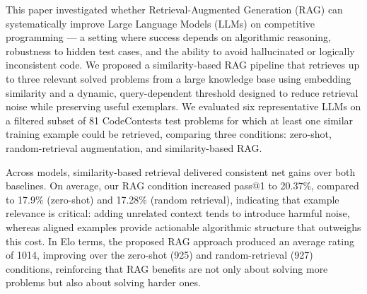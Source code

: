 \documentclass[preprint,12pt]{elsarticle}
\begin{document}



This paper investigated whether Retrieval-Augmented Generation (RAG) can systematically improve Large Language Models (LLMs) on competitive programming — a setting where success depends on algorithmic reasoning, robustness to hidden test cases, and the ability to avoid hallucinated or logically inconsistent code. We proposed a similarity-based RAG pipeline that retrieves up to three relevant solved problems from a large knowledge base using embedding similarity and a dynamic, query-dependent threshold designed to reduce retrieval noise while preserving useful exemplars. We evaluated six representative LLMs on a filtered subset of 81 CodeContests test problems for which at least one similar training example could be retrieved, comparing three conditions: zero-shot, random-retrieval augmentation, and similarity-based RAG. 

Across models, similarity-based retrieval delivered consistent net gains over both baselines. On average, our RAG condition increased pass@1 to 20.37\%, compared to 17.9\% (zero-shot) and 17.28\% (random retrieval), indicating that example relevance is critical: adding unrelated context tends to introduce harmful noise, whereas aligned examples provide actionable algorithmic structure that outweighs this cost. In Elo terms, the proposed RAG approach produced an average rating of 1014, improving over the zero-shot (925) and random-retrieval (927) conditions, reinforcing that RAG benefits are not only about solving more problems but also about solving harder ones. 
\end{document}
